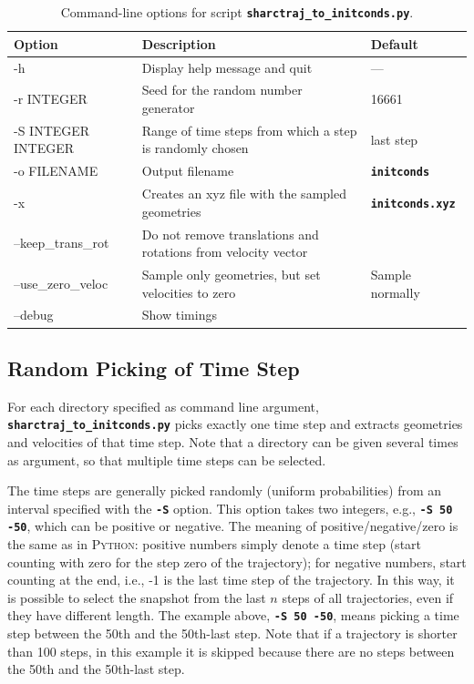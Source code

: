 \documentclass[a4paper,10pt,DIV=15,openany,twoside=false]{scrbook}
\newcommand{\ttt}[1]{\textbf{\texttt{#1}}}
\begin{document}
\begin{table}
  \centering
  \caption{Command-line options for script \ttt{sharctraj\_to\_initconds.py}.}
  \label{tab:sharctraj_opts}
  \begin{tabular}{>{\ttfamily}lp{9cm}l}
    \toprule
    \rmfamily Option        &Description      &Default\\
    \midrule
    -h                  &Display help message and quit              &---                            \\
    -r  INTEGER         &Seed for the random number generator       &16661                          \\
    -S INTEGER INTEGER  &Range of time steps from which a step is randomly chosen       &last step  \\
    -o  FILENAME        &Output filename                            &\ttt{initconds}                \\
    -x                  &Creates an xyz file with the sampled geometries &\ttt{initconds.xyz}       \\
    --keep\_trans\_rot  &Do not remove translations and rotations from velocity vector &\\
    --use\_zero\_veloc  &Sample only geometries, but set velocities to zero     &Sample normally\\
    --debug             &Show timings                                           &\\
    \bottomrule
  \end{tabular}
\end{table}

\subsection{Random Picking of Time Step}

For each directory specified as command line argument, \ttt{sharctraj\_to\_initconds.py} picks exactly one time step and extracts geometries and velocities of that time step.
Note that a directory can be given several times as argument, so that multiple time steps can be selected.

The time steps are generally picked randomly (uniform probabilities) from an interval specified with the \ttt{-S} option.
This option takes two integers, e.g., \ttt{-S 50 -50}, which can be positive or negative.
The meaning of positive/negative/zero is the same as in \textsc{Python}: positive numbers simply denote a time step (start counting with zero for the step zero of the trajectory); for negative numbers, start counting at the end, i.e., -1 is the last time step of the trajectory.
In this way, it is possible to select the snapshot from the last $n$ steps of all trajectories, even if they have different length.
The example above, \ttt{-S 50 -50}, means picking a time step between the 50th and the 50th-last step. Note that if a trajectory is shorter than 100 steps, in this example it is skipped because there are no steps between the 50th and the 50th-last step.
\end{document}
